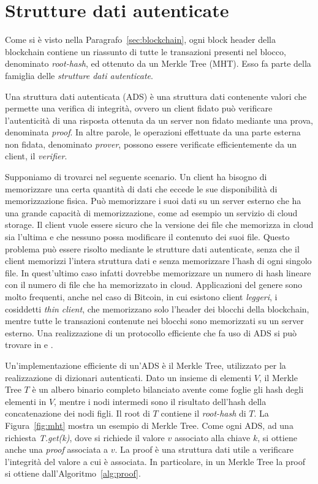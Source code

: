 \section{Strutture dati autenticate}

Come si è visto nella Paragrafo~\ref{sec:blockchain}, ogni block header della blockchain contiene un riassunto di tutte le transazioni presenti nel blocco, denominato \emph{root-hash}, ed ottenuto da un Merkle Tree (MHT). Esso fa parte della famiglia delle \emph{strutture dati autenticate}.

Una struttura dati autenticata (ADS) è una struttura dati contenente valori che permette una verifica di integrità, ovvero un client fidato può verificare l'autenticità di una risposta ottenuta da un server non fidato mediante una prova, denominata \emph{proof}. In altre parole, le operazioni effettuate da una parte esterna non fidata, denominato \emph{prover}, possono essere verificate efficientemente da un client, il \emph{verifier}.

Supponiamo di trovarci nel seguente scenario. Un client ha bisogno di memorizzare una certa quantità di dati che eccede le sue disponibilità di memorizzazione fisica. Può memorizzare i suoi dati su un server esterno che ha una grande capacità di memorizzazione, come ad esempio un servizio di cloud storage. Il client vuole essere sicuro che la versione dei file che memorizza in cloud sia l'ultima e che nessuno possa modificare il contenuto dei suoi file. Questo problema può essere risolto mediante le strutture dati autenticate, senza che il client memorizzi l'intera struttura dati e senza memorizzare l'hash di ogni singolo file. In quest'ultimo caso infatti dovrebbe memorizzare un numero di hash lineare con il numero di file che ha memorizzato in cloud. Applicazioni del genere sono molto frequenti, anche nel caso di Bitcoin, in cui esistono client \emph{leggeri}, i cosiddetti \emph{thin client}, che memorizzano solo l'header dei blocchi della blockchain, mentre tutte le transazioni contenute nei blocchi sono memorizzati su un server esterno. Una realizzazione di un protocollo efficiente che fa uso di ADS si può trovare in \cite{pennino2019pipeline} e \cite{gdm}.

Un'implementazione efficiente di un'ADS è il Merkle Tree, utilizzato per la realizzazione di dizionari autenticati. Dato un insieme di elementi $V$, il Merkle Tree $T$ è un albero binario completo bilanciato avente come foglie gli hash degli elementi in $V$, mentre i nodi intermedi sono il risultato dell'hash della concatenazione dei nodi figli. Il root di $T$ contiene il \emph{root-hash} di $T$. La Figura~\ref{fig:mht} mostra un esempio di Merkle Tree.
Come ogni ADS, ad una richiesta \emph{T.get(k)}, dove si richiede il valore $v$ associato alla chiave $k$, si ottiene anche una \emph{proof} associata a $v$. La proof è una struttura dati utile a verificare l'integrità del valore a cui è associata. In particolare, in un Merkle Tree la proof si ottiene dall'Algoritmo~\ref{alg:proof}.

